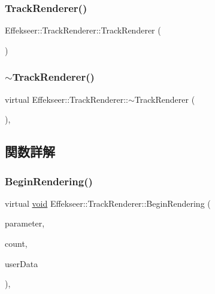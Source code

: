 \subsubsection{\texorpdfstring{Track\+Renderer()}{TrackRenderer()}}
{\footnotesize\ttfamily Effekseer\+::\+Track\+Renderer\+::\+Track\+Renderer (\begin{DoxyParamCaption}{ }\end{DoxyParamCaption})\hspace{0.3cm}{\ttfamily [inline]}}

\mbox{\label{class_effekseer_1_1_track_renderer_a2880354ffae0aeadffa3351968a8a99f}} 
\subsubsection{\texorpdfstring{$\sim$\+Track\+Renderer()}{~TrackRenderer()}}
{\footnotesize\ttfamily virtual Effekseer\+::\+Track\+Renderer\+::$\sim$\+Track\+Renderer (\begin{DoxyParamCaption}{ }\end{DoxyParamCaption})\hspace{0.3cm}{\ttfamily [inline]}, {\ttfamily [virtual]}}



\subsection{関数詳解}
\mbox{\label{class_effekseer_1_1_track_renderer_ac252e85dddf2e8cc34b14dd00ab803b5}} 
\subsubsection{\texorpdfstring{Begin\+Rendering()}{BeginRendering()}}
{\footnotesize\ttfamily virtual \mbox{\hyperlink{namespace_effekseer_ab34c4088e512200cf4c2716f168deb56}{void}} Effekseer\+::\+Track\+Renderer\+::\+Begin\+Rendering (\begin{DoxyParamCaption}\item[{const \mbox{\hyperlink{struct_effekseer_1_1_track_renderer_1_1_node_parameter}{Node\+Parameter}} \&}]{parameter,  }\item[{int32\+\_\+t}]{count,  }\item[{\mbox{\hyperlink{namespace_effekseer_ab34c4088e512200cf4c2716f168deb56}{void}} $\ast$}]{user\+Data }\end{DoxyParamCaption})\hspace{0.3cm}{\ttfamily [inline]}, {\ttfamily [virtual]}}

